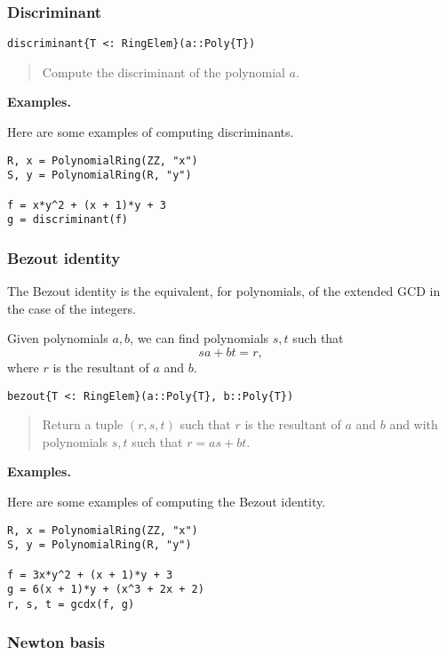 \documentclass[a4paper,10pt]{article}
\newcommand{\desc}[1]{\vspace{-3mm}\begin{quote}#1\end{quote}}
\begin{document}
\subsubsection{Discriminant}

\begin{lstlisting}
discriminant{T <: RingElem}(a::Poly{T})
\end{lstlisting}

\desc{Compute the discriminant of the polynomial $a$.}

\textbf{Examples.}

Here are some examples of computing discriminants.

\begin{lstlisting}
R, x = PolynomialRing(ZZ, "x")
S, y = PolynomialRing(R, "y")

f = x*y^2 + (x + 1)*y + 3
g = discriminant(f)
\end{lstlisting}

\subsubsection{Bezout identity}

The Bezout identity is the equivalent, for polynomials, of the extended GCD
in the case of the integers.

Given polynomials $a, b$, we can find polynomials $s, t$ such that
$$sa + bt = r,$$
where $r$ is the resultant of $a$ and $b$.

\begin{lstlisting}
bezout{T <: RingElem}(a::Poly{T}, b::Poly{T})
\end{lstlisting}

\desc{Return a tuple $(r, s, t)$ such that $r$ is the resultant of $a$ and $b$
and with polynomials $s, t$ such that $r = as + bt$.}

\textbf{Examples.}

Here are some examples of computing the Bezout identity.

\begin{lstlisting}
R, x = PolynomialRing(ZZ, "x")
S, y = PolynomialRing(R, "y")

f = 3x*y^2 + (x + 1)*y + 3
g = 6(x + 1)*y + (x^3 + 2x + 2)
r, s, t = gcdx(f, g)
\end{lstlisting}

\subsubsection{Newton basis}
\end{document}
